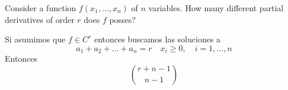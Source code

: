 \item  Consider a function $f(x_1, \dots, x_n)$ of $n$ variables. How many different partial derivatives of order $r$ does $f$ posses?

Si asumimos que $f \in C^r$ entonces buscamos las soluciones a 
\[ a_1 + a_2 + \dots + a_n = r\quad x_i \ge 0, \quad i=1,\dots,n \]
Entonces
\[ \binom{r+n-1}{n-1} \]